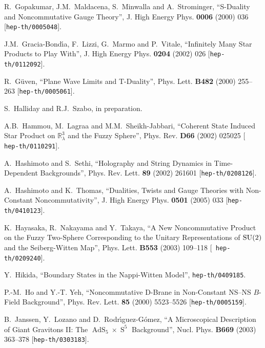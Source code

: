 \documentclass[11pt,a4paper]{article}
\DeclareMathOperator{\AdS}{AdS}
\DeclareMathOperator{\Sphere}{S}
\let\S\Sphere
\newcommand{\real}{{\mathbb R}} %
\begin{document}
\begin{thebibliography}{99}
 R.~Gopakumar, J.M.~Maldacena, S.~Minwalla and
  A.~Strominger, ``S-Duality and Noncommutative Gauge Theory'',
  J. High Energy Phys. {\bf 0006} (2000) 036 [{\tt hep-th/0005048}].

 J.M.~Gracia-Bond\'{\i}a, F.~Lizzi, G.~Marmo and
  P.~Vitale, ``Infinitely Many Star Products to Play With'', J. High
  Energy Phys. {\bf 0204} (2002) 026 [{\tt hep-th/0112092}].

 R.~G\"uven, ``Plane Wave Limits and T-Duality'',
  Phys. Lett. {\bf B482} (2000) 255--263 [{\tt hep-th/0005061}].

 S.~Halliday and R.J.~Szabo, in preparation.

 A.B.~Hammou, M.~Lagraa and M.M.~Sheikh-Jabbari,
  ``Coherent State Induced Star Product on $\real_\lambda^3$ and the
  Fuzzy Sphere'', Phys. Rev. {\bf D66} (2002) 025025 [{\tt
    hep-th/0110291}].

 A.~Hashimoto and S.~Sethi, ``Holography and String
  Dynamics in Time-Dependent Backgrounds'', Phys. Rev. Lett. {\bf 89}
  (2002) 261601 [{\tt hep-th/0208126}].

 A.~Hashimoto and K.~Thomas, ``Dualities, Twists and
  Gauge Theories with Non-Constant Noncommutativity'', J. High Energy
  Phys. {\bf 0501} (2005) 033 [{\tt hep-th/0410123}].

 K.~Hayasaka, R.~Nakayama and Y.~Takaya, ``A New
  Noncommutative Product on the Fuzzy Two-Sphere Corresponding to the
  Unitary Representations of ${\rm SU}(2)$ and the Seiberg-Witten
  Map'', Phys. Lett. {\bf B553} (2003) 109--118 [{\tt
    hep-th/0209240}].

 Y.~Hikida, ``Boundary States in the Nappi-Witten
  Model'', {\tt hep-th/0409185}.

 P.-M.~Ho and Y.-T. Yeh, ``Noncommutative D-Brane in
  Non-Constant NS--NS $B$-Field Background'', Phys. Rev. Lett. {\bf 85}
  (2000) 5523--5526 [{\tt hep-th/0005159}].

 B.~Janssen, Y.~Lozano and D.~Rodr\'{\i}guez-G\'omez,
  ``A Microscopical Description of Giant Gravitons II: The
  $\AdS_5\times\S^5$ Background'', Nucl. Phys. {\bf B669} (2003)
  363--378 [{\tt hep-th/0303183}].


\end{thebibliography}
\end{document}
